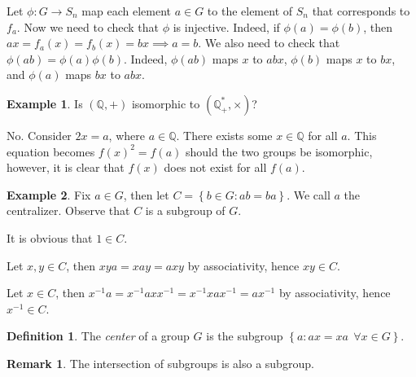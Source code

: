 \documentclass[11pt]{article}
\theoremstyle{definition}
\newtheorem{defn}{Definition}[section]
\newtheorem{example}{Example}[section]
\newtheorem{remark}{Remark}[section]
\newcommand{\set}[1]{\left\{ #1 \right\}}
\newcommand{\QQ}{\mathbb{Q}}
\begin{document}
Let $\phi:G\to S_n$ map each element $a\in G$ to the element of $S_n$ that corresponds to
$f_a$. Now we need to check that $\phi$ is injective. Indeed, if $\phi(a) = \phi(b)$, then
$ax = f_a(x) = f_b(x) = bx \implies a=b$. We also need to check that $\phi(ab) =
\phi(a)\phi(b)$. Indeed, $\phi(ab)$ maps $x$ to $abx$, $\phi(b)$ maps $x$ to $bx$, and
$\phi(a)$ maps $bx$ to $abx$.
\qedhere

\begin{example}
	Is $(\QQ,+)$ isomorphic to $(\QQ^*_+,\times)$?

	No. Consider $2x=a$, where $a\in\QQ$. There exists some $x\in\QQ$ for all $a$. This 
	equation becomes $f(x)^2=f(a)$ should the two groups be isomorphic, however, it is
	clear that $f(x)$ does not exist for all $f(a)$. 
\end{example}

\begin{example}
	Fix $a\in G$, then let $C = \set{b\in G : ab=ba}$. We call $a$ the centralizer.
	Observe that $C$ is a subgroup of $G$. 

	It is obvious that $1\in C$.

	Let $x,y\in C$, then $xya = xay = axy$ by associativity, hence $xy\in C$. 

	Let $x\in C$, then $x^{-1}a = x^{-1}axx^{-1} = x^{-1}xax^{-1} = ax^{-1}$ by
	associativity, hence $x^{-1}\in C$. 
\end{example}

\begin{defn}
	The \emph{center} of a group $G$ is the subgroup $\set{a:ax=xa ~~\forall x\in G}$. 
\end{defn}

\begin{remark}
	The intersection of subgroups is also a subgroup. 
\end{remark}













\end{document}
